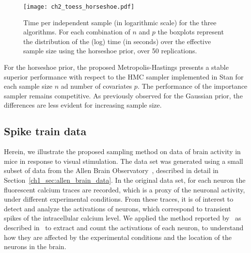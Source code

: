 \begin{figure}[h!]
	\begin{center}
		\texttt{[image: ch2\_toess\_horseshoe.pdf]}
		\caption[Comparison between the time per independent sample of the proposed algorithms and of the HMC algorithm, using a horseshoe prior.]{Time per independent sample (in logarithmic scale) for the three algorithms. For each combination of $n$ and $p$ the boxplots represent the distribution of the (log) time (in seconds) over the effective sample size using the horseshoe prior, over 50 replications.
			\label{fig:time_ess_horseshoe}}
	\end{center}
\end{figure}
%
For the horseshoe prior, the proposed Metropolis-Hastings presents a stable superior performance with respect to the HMC sampler implemented in Stan for each sample size $n$ ad number of covariates $p$. The performance of the importance sampler remains competitive. As previously observed for the Gaussian prior, the differences are less evident for increasing sample size. 





\subsection{Spike train data}
\label{ch2_sec:application}
%
Herein, we illustrate the proposed sampling method on data of brain activity in mice in response to visual stimulation.
The data set was generated using a small subset of data from the Allen Brain Observatory~\citep{allen}, described in detail in Section~\ref{ch1_sec:allen_brain_data}.
In the original data set, for each neuron the fluorescent calcium traces are recorded, which is a proxy of the neuronal activity, under different experimental conditions. From these traces, it is of interest to detect and analyze the activations of neurons, which correspond to transient spikes of the intracellular calcium level. 
We applied the method reported by~\citet{jewell2019} as described in~\citet{vries2020} to extract and count the activations of each neuron, to understand how they are affected by the experimental conditions and the location of the neurons in the brain. 

